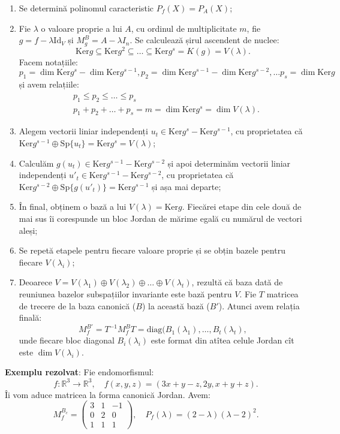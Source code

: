\documentclass[11pt,a4paper]{article}
\newcommand\seq{\subseteq}
\newcommand\RR{\mathbb{R}}
\newcommand\Ker{\mathrm{Ker}}
\theoremstyle{dotless}
\theoremstyle{dotlessdr}
\begin{document}
\begin{enumerate}[(1)]
\item Se determină polinomul caracteristic $P_f(X) = P_A(X)$;
\item Fie $\lambda$ o valoare proprie a lui $A$, cu ordinul de multiplicitate $m$,
  fie $g = f - \lambda \mathrm{Id}_V$ și $M_g^B = A - \lambda I_n$. Se calculează
  șirul ascendent de nuclee:
  \[
    \Ker g \seq \Ker g^2 \seq \dots \seq \Ker g^s = K(g) = V(\lambda).
  \]
  Facem notațiile:
  \[
    p_1 = \dim \Ker g^s - \dim \Ker g^{s-1}, p_2 = \dim \Ker g^{s-1} - \dim \Ker g^{s-2}, \dots %
    p_s = \dim \Ker g
  \]
  și avem relațiile:
  \begin{align*}
    & p_1 \leq p_2 \leq \dots \leq p_s \\
    & p_1 + p_2 + \dots + p_s = m = \dim \Ker g^s = \dim V(\lambda).
  \end{align*}
\item Alegem vectorii liniar independenți $u_t \in \Ker g^s - \Ker g^{s-1}$, cu proprietatea
  că $\Ker g^{s-1} \oplus \mathrm{Sp}\{u_t \} = \Ker g^s = V(\lambda)$;
\item Calculăm $g(u_t) \in \Ker g^{s-1} - \Ker g^{s-2}$ și apoi determinăm
  vectorii liniar independenți $u'_t \in \Ker g^{s-1} - \Ker g^{s-2}$, cu proprietatea
  că $\Ker g^{s-2} \oplus \mathrm{Sp}\{ g(u'_t)\} = \Ker g^{s-1}$ și așa mai departe;
\item În final, obținem o bază a lui $V(\lambda) = \Ker g$. Fiecărei etape din cele două
  de mai sus îi corespunde un bloc Jordan de mărime egală cu numărul de vectori aleși;
\item Se repetă etapele pentru fiecare valoare proprie și se obțin bazele pentru fiecare
  $V(\lambda_i)$;
\item Deoarece $V = V(\lambda_1) \oplus V(\lambda_2) \oplus \dots \oplus V(\lambda_t)$, rezultă
  că baza dată de reuniunea bazelor subspațiilor invariante este bază pentru $V$. Fie $T$
  matricea de trecere de la baza canonică ($B$) la această bază ($B'$). Atunci avem relația finală:
  \[
    M_f^{B'} = T^{-1} M_f^B T = \mathrm{diag}(B_1(\lambda_1), \dots, B_t(\lambda_t),
  \]
  unde fiecare bloc diagonal $B_i(\lambda_i)$ este format din atîtea celule Jordan
  cît este $\dim V(\lambda_i)$.
\end{enumerate}


\textbf{Exemplu rezolvat}: Fie endomorfismul:
\[
  f : \RR^3 \to \RR^3, \quad f(x,y,z) = (3x + y - z, 2y, x + y + z).
\]
Îi vom aduce matricea la forma canonică Jordan. Avem:
\[
  M_f^{B_c} =
  \begin{pmatrix}
    3 & 1 & -1 \\
    0 & 2 & 0 \\
    1 & 1 & 1
  \end{pmatrix}, \quad P_f(\lambda) = (2 - \lambda)(\lambda-2)^2.
\]
\end{document}
